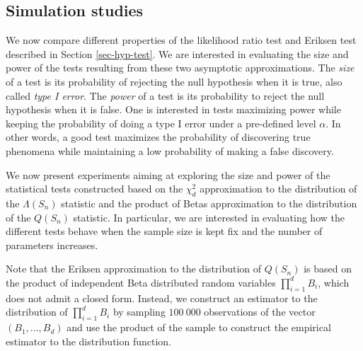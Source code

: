 \subsection{Simulation studies}

We now compare different properties of the likelihood ratio test and Eriksen test described in Section \ref{sec-hyp-test}. We are interested in evaluating the size and power of the tests resulting from these two asymptotic approximations. The \textit{size} of a test is its probability of rejecting the null hypothesis when it is true, also called \textit{type I error}. The \textit{power} of a test is its probability to reject the null hypothesis when it is false. One is interested in tests maximizing power while keeping the probability of doing a type I error under a pre-defined level $\alpha$. In other words, a good test maximizes the probability of discovering true phenomena while maintaining a low probability of making a false discovery. 

We now present experiments aiming at exploring the size and power of the statistical tests constructed based on the $\chi^2_d$ approximation to the distribution of the $\Lambda(S_n)$ statistic and the product of Betas approximation to the distribution of the $Q(S_n)$ statistic. In particular, we are interested in evaluating how the different tests behave when the sample size is kept fix and the number of parameters increases.

Note that the Eriksen approximation to the distribution of $Q(S_n)$ is based on the product of independent Beta distributed random variables $\prod_{i=1}^d B_i$, which does not admit a closed form. Instead, we construct an estimator to the distribution of $\prod_{i=1}^d B_i$ by sampling $100\ 000$ observations of the vector $(B_1, \ldots, B_d)$ and use the product of the sample to construct the empirical estimator to the distribution function.

